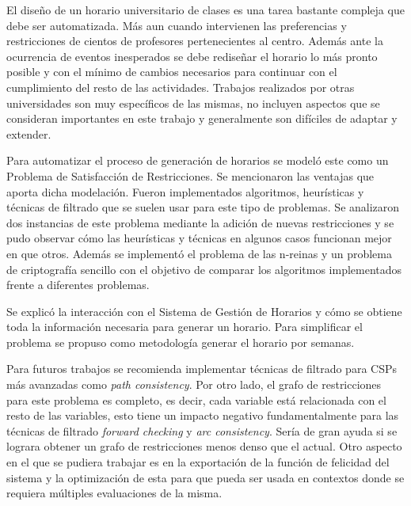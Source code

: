 \begin{conclusions}

El diseño de un horario universitario de clases es una tarea bastante compleja que debe ser automatizada. M\'as aun cuando intervienen las preferencias y restricciones de cientos de profesores pertenecientes al centro. Adem\'as ante la ocurrencia de eventos inesperados se debe rediseñar el horario lo m\'as pronto posible y con el m\'inimo de cambios necesarios para continuar con el cumplimiento del resto de las actividades. Trabajos realizados por otras universidades son muy espec\'ificos de las mismas, no incluyen aspectos que se consideran importantes en este trabajo y generalmente son dif\'iciles de adaptar y extender.

Para automatizar el proceso de generaci\'on de horarios se model\'o este como un Problema de Satisfacci\'on de Restricciones. Se mencionaron las ventajas que aporta dicha modelaci\'on. Fueron implementados algoritmos, heur\'isticas y t\'ecnicas de filtrado que se suelen usar para este tipo de problemas. Se analizaron dos instancias de este problema mediante la adici\'on de nuevas restricciones y se pudo observar c\'omo las heur\'isticas y t\'ecnicas en algunos casos funcionan mejor en que otros. Adem\'as se implement\'o el problema de las n-reinas y un problema de criptograf\'ia sencillo con el objetivo de comparar los algoritmos implementados frente a diferentes problemas.

Se explic\'o la interacci\'on con el Sistema de Gesti\'on de Horarios y c\'omo se obtiene toda la informaci\'on necesaria para generar un horario. Para simplificar el problema se propuso como metodolog\'ia generar el horario por semanas.

Para futuros trabajos se recomienda implementar t\'ecnicas de filtrado para CSPs m\'as avanzadas como \emph{path consistency}. Por otro lado, el grafo de restricciones para este problema es completo, es decir, cada variable est\'a relacionada con el resto de las variables, esto tiene un impacto negativo fundamentalmente para las t\'ecnicas de filtrado \emph{forward checking} y \emph{arc consistency}. Ser\'ia de gran ayuda si se lograra obtener un grafo de restricciones menos denso que el actual. Otro aspecto en el que se pudiera trabajar es en la exportaci\'on de la funci\'on de felicidad del sistema y la optimizaci\'on de esta para que pueda ser usada en contextos donde se requiera m\'ultiples evaluaciones de la misma.

\end{conclusions}
